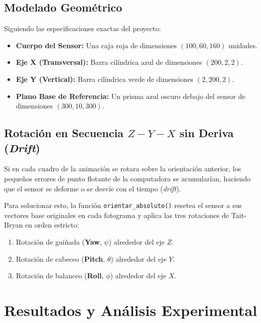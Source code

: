 \documentclass[12pt,letterpaper]{article}
\begin{document}
\subsection{Modelado Geométrico}
Siguiendo las especificaciones exactas del proyecto:
\begin{itemize}
    \item \textbf{Cuerpo del Sensor:} Una caja roja de dimensiones $(100, 60, 160)$ unidades.
    \item \textbf{Eje X (Transversal):} Barra cilíndrica azul de dimensiones $(200, 2, 2)$.
    \item \textbf{Eje Y (Vertical):} Barra cilíndrica verde de dimensiones $(2, 200, 2)$.
    \item \textbf{Plano Base de Referencia:} Un prisma azul oscuro debajo del sensor de dimensiones $(300, 10, 300)$.
\end{itemize}

\subsection{Rotación en Secuencia $Z-Y-X$ sin Deriva (\textit{Drift})}
Si en cada cuadro de la animación se rotara sobre la orientación anterior, los pequeños errores de punto flotante de la computadora se acumularían, haciendo que el sensor se deforme o se desvíe con el tiempo (\textit{drift}). 

Para solucionar esto, la función \texttt{orientar\_absoluto()} resetea el sensor a sus vectores base originales en cada fotograma y aplica las tres rotaciones de Tait-Bryan en orden estricto:
\begin{enumerate}
    \item Rotación de guiñada (\textbf{Yaw}, $\psi$) alrededor del eje $Z$.
    \item Rotación de cabeceo (\textbf{Pitch}, $\theta$) alrededor del eje $Y$.
    \item Rotación de balanceo (\textbf{Roll}, $\phi$) alrededor del eje $X$.
\end{enumerate}

\section{Resultados y Análisis Experimental}
\end{document}
